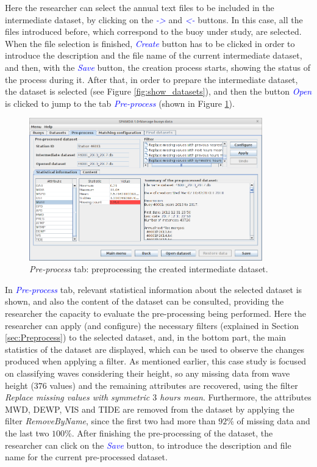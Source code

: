 \documentclass[energies,article,submit,moreauthors,pdftex]{Definitions/mdpi}
\begin{document}
			Here the researcher can select the annual text files to be included in the intermediate dataset, by clicking on the \textcolor{blue}{\textit{->}} and \textcolor{blue}{\textit{<-}} buttons. In this case, all the files introduced before, which correspond to the buoy under study, are selected. When the file selection is finished, \textcolor{blue}{\textit{Create}} button has to be clicked in order to introduce the description and the file name of the current intermediate dataset, and then, with the \textcolor{blue}{\textit{Save}} button, the creation process starts, showing the status of the process during it. After that, in order to prepare the intermediate dataset, the dataset is selected (see Figure \ref{fig:show_datasets}), and then the button \textcolor{blue}{\textit{Open}} is clicked to jump to the tab \textcolor{blue}{\textit{Pre-process}} (shown in Figure \ref{fig:preprocess_data}).
			
			\begin{figure}[ht!]
				\centering
				\includegraphics[width=0.90\textwidth]{figures/FigurePreprocess.png}
				\caption{\textit{Pre-process} tab: preprocessing the created intermediate dataset.}\label{fig:preprocess_data}
			\end{figure}

			
			In \textcolor{blue}{\textit{Pre-process}} tab, relevant statistical information about the selected dataset is shown, and also the content of the dataset can be consulted, providing the researcher the capacity to evaluate the pre-processing being performed. Here the researcher can apply (and configure) the necessary filters (explained in Section \ref{sec:Preprocess}) to the selected dataset, and, in the bottom part, the main statistics of the dataset are displayed, which can be used to observe the changes produced when applying a filter. As mentioned earlier, this case study is focused on classifying waves considering their height, so any missing data from wave height ($376$ values) and the remaining attributes are recovered, using the filter \textit{Replace missing values with symmetric $3$ hours mean}. Furthermore, the attributes MWD, DEWP, VIS and TIDE are removed from the dataset by applying the filter \textit{RemoveByName}, since the first two had more than $92$\% of missing data and the last two $100$\%. After finishing the pre-processing of the dataset, the researcher can click on the \textcolor{blue}{\textit{Save}} button, to introduce the description and file name for the current pre-processed dataset.
			
\end{document}
